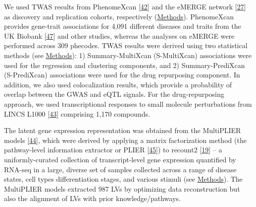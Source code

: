 \documentclass[
        11pt,
]{article}
\begin{document}
We used TWAS results from PhenomeXcan {[}\protect\hyperlink{ref-lY5ln3dB}{42}{]} and the eMERGE network {[}\protect\hyperlink{ref-gZAOkumx}{27}{]} as discovery and replication cohorts, respectively (\protect\hyperlink{sec:methods:twas}{Methods}).
PhenomeXcan provides gene-trait associations for 4,091 different diseases and traits from the UK Biobank {[}\protect\hyperlink{ref-nmJxPpE5}{47}{]} and other studies, whereas the analyses on eMERGE were performed across 309 phecodes.
TWAS results were derived using two statistical methods (see \protect\hyperlink{sec:methods:predixcan}{Methods}):
1) Summary-MultiXcan (S-MultiXcan) associations were used for the regression and clustering components,
and 2) Summary-PrediXcan (S-PrediXcan) associations were used for the drug repurposing component.
In addition, we also used colocalization results, which provide a probability of overlap between the GWAS and eQTL signals.
For the drug-repurposing approach, we used transcriptional responses to small molecule perturbations from LINCS L1000 {[}\protect\hyperlink{ref-F7lIlh2N}{43}{]} comprising 1,170 compounds.

The latent gene expression representation was obtained from the MultiPLIER models {[}\protect\hyperlink{ref-14rnBunuZ}{44}{]}, which were derived by applying a matrix factorization method (the pathway-level information extractor or PLIER {[}\protect\hyperlink{ref-Ki2ij7zE}{45}{]}) to recount2 {[}\protect\hyperlink{ref-6SPTvFXq}{19}{]} -- a uniformly-curated collection of transcript-level gene expression quantified by RNA-seq in a large, diverse set of samples collected across a range of disease states, cell types differentiation stages, and various stimuli (see \protect\hyperlink{sec:methods:multiplier}{Methods}).
The MultiPLIER models extracted 987 LVs by optimizing data reconstruction but also the alignment of LVs with prior knowledge/pathways.
\end{document}
